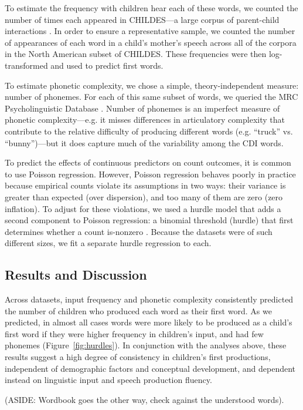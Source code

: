 \documentclass[10pt,letterpaper]{article}
\begin{document}
To estimate the frequency with children hear each of these words, we counted the number of times each appeared in CHILDES---a large corpus of parent-child interactions \cite{macwhinney2000}. In order to ensure a representative sample, we counted the number of appearances of each word in a child's mother's speech across all of the corpora in the North American subset of CHILDES. These frequencies were then log-transformed and used to predict first words.

To estimate phonetic complexity, we chose a simple, theory-independent measure: number of phonemes. For each of this same subset of words, we queried the MRC Psycholinguistic Database \cite{Wilson1988}. Number of phonemes is an imperfect measure of phonetic complexity---e.g. it misses differences in articulatory complexity that contribute to the relative difficulty of producing different words (e.g. ``truck'' vs. ``bunny'')---but it does capture much of the variability among the CDI words.

To predict the effects of continuous predictors on count outcomes, it is common to use Poisson regression. However, Poisson regression behaves poorly in practice because empirical counts violate its assumptions in two ways: their variance is greater than expected (over dispersion), and too many of them are zero (zero inflation). To adjust for these violations, we used a hurdle model that adds a second component to Poisson regression: a binomial threshold (hurdle) that first determines whether a count is-nonzero \cite{mullahy1986}. Because the datasets were of such different sizes, we fit a separate hurdle regression to each.

\subsection{Results and Discussion}

Across datasets, input frequency and phonetic complexity consistently predicted the number of children who produced each word as their first word. As we predicted, in almost all cases words were more likely to be produced as a child's first word if they were higher frequency in children's input, and had few phonemes (Figure~\ref{fig:hurdles}). In conjunction with the analyses above, these results suggest a high degree of consistency in children's first productions, independent of demographic factors and conceptual development, and dependent instead on linguistic input and speech production fluency.

(ASIDE: Wordbook goes the other way, check against the understood words).
\end{document}
